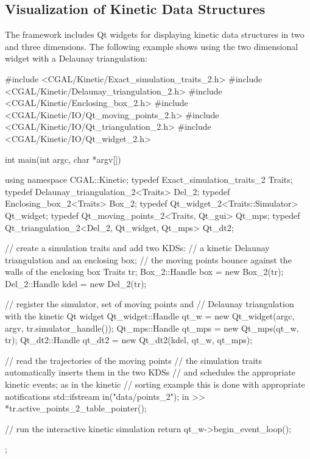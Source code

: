 

\subsection{Visualization of Kinetic Data Structures}
\label{sec:delaunay_2_example}

The framework includes Qt widgets for displaying kinetic data
structures in two and three dimensions. The following example shows
using the two dimensional widget with a Delaunay triangulation:

\begin{ccExampleCode}
#include <CGAL/Kinetic/Exact_simulation_traits_2.h>
#include <CGAL/Kinetic/Delaunay_triangulation_2.h>
#include <CGAL/Kinetic/Enclosing_box_2.h>
#include <CGAL/Kinetic/IO/Qt_moving_points_2.h>
#include <CGAL/Kinetic/IO/Qt_triangulation_2.h>
#include <CGAL/Kinetic/IO/Qt_widget_2.h>

int main(int argc, char *argv[]) {
    using namespace CGAL::Kinetic;
    typedef Exact_simulation_traits_2 Traits;
    typedef Delaunay_triangulation_2<Traits> Del_2;
    typedef Enclosing_box_2<Traits> Box_2;
    typedef Qt_widget_2<Traits::Simulator> Qt_widget;
    typedef Qt_moving_points_2<Traits, Qt_gui> Qt_mps;
    typedef Qt_triangulation_2<Del_2, Qt_widget, Qt_mps> Qt_dt2;
    
    // create a simulation traits and add two KDSs:
    // a kinetic Delaunay triangulation and an enclosing box;
    // the moving points bounce against the walls of the enclosing box
    Traits tr;
    Box_2::Handle box = new Box_2(tr);
    Del_2::Handle kdel = new Del_2(tr);

    // register the simulator, set of moving points and
    // Delaunay triangulation with the kinetic Qt widget
    Qt_widget::Handle qt_w = new Qt_widget(argc, argv, tr.simulator_handle());
    Qt_mps::Handle qt_mps = new Qt_mps(qt_w, tr);
    Qt_dt2::Handle qt_dt2 = new Qt_dt2(kdel, qt_w, qt_mps);

    // read the trajectories of the moving points
    //  the simulation traits automatically inserts them in the two KDSs
    // and schedules the appropriate kinetic events; as in the kinetic
    // sorting example this is done with appropriate notifications
    std::ifstream in("data/points_2");    
    in  >> *tr.active_points_2_table_pointer();

    // run the interactive kinetic simulation
    return qt_w->begin_event_loop();
};
\end{ccExampleCode}


